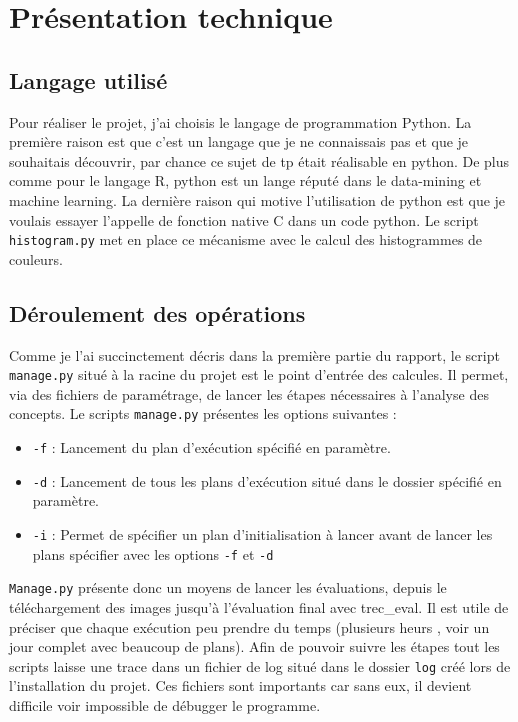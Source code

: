 \documentclass[a4paper, 11pt]{article}
\begin{document}
\section{Présentation technique}

\subsection{Langage utilisé}
Pour réaliser le projet, j'ai choisis le langage de programmation Python. La première raison est que c'est un langage que je ne connaissais pas et que je souhaitais découvrir, par chance ce sujet de tp était réalisable en python. De plus comme pour le langage R, python est un lange réputé dans le data-mining et machine learning. La dernière raison qui motive l'utilisation de python est que je voulais essayer l'appelle de fonction native C dans un code python. Le script \texttt{histogram.py} met en place ce mécanisme avec le calcul des histogrammes de couleurs.

\subsection{Déroulement des opérations}
Comme je l'ai succinctement décris dans la première partie du rapport, le script \texttt{manage.py} situé à la racine du projet est le point d'entrée des calcules. Il permet, via des fichiers de paramétrage, de lancer les étapes nécessaires à l'analyse des concepts.
Le scripts \texttt{manage.py} présentes les options suivantes :
\begin{itemize}
	\item \texttt{-f} : Lancement du plan d'exécution spécifié en paramètre.
    \item \texttt{-d} : Lancement de tous les plans d'exécution situé dans le dossier spécifié en paramètre.
    \item \texttt{-i} : Permet de spécifier un plan d'initialisation à lancer avant de lancer les plans spécifier avec les options \texttt{-f} et \texttt{-d}
\end{itemize}

\texttt{Manage.py} présente donc un moyens de lancer les évaluations, depuis le téléchargement des images jusqu'à l'évaluation final avec trec\_eval. Il est utile de préciser que chaque exécution peu prendre du temps (plusieurs heurs , voir un jour complet avec beaucoup de plans). Afin de pouvoir suivre les étapes tout les scripts laisse une trace dans un fichier de log situé dans le dossier \texttt{log} créé lors de l'installation du projet. Ces fichiers sont importants car sans eux, il devient difficile voir impossible de débugger le programme.
\end{document}
